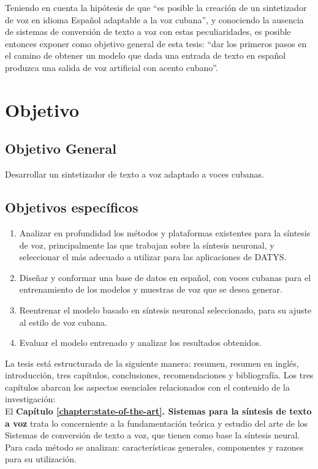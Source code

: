 Teniendo en cuenta la hipótesis de que “es posible la creación de un sintetizador de voz en idioma Español adaptable a la voz cubana”, y conociendo la ausencia de sistemas de conversión de texto a voz con estas peculiaridades, es posible entonces exponer como objetivo general de esta tesis: ``dar los primeros pasos en el camino de obtener un modelo que dada una entrada de texto en español produzca una salida de voz artificial con acento cubano''.

\section*{Objetivo}

\subsection*{Objetivo General}

Desarrollar un sintetizador de texto a voz adaptado a voces cubanas.

\subsection*{Objetivos específicos}
\begin{enumerate}
	\item Analizar en profundidad los métodos y plataformas existentes para la síntesis de voz, principalmente las que trabajan sobre la síntesis neuronal, y seleccionar el más adecuado a utilizar para las aplicaciones de DATYS.
	\item Diseñar y conformar una base de datos en español, con voces cubanas para el entrenamiento de los modelos y muestras de voz que se desea generar.
	\item Reentrenar el modelo basado en síntesis neuronal seleccionado, para su ajuste al estilo de voz cubana.
	\item Evaluar el modelo entrenado y analizar los resultados obtenidos.
\end{enumerate}

La tesis está estructurada de la siguiente manera: resumen, resumen en inglés, introducción, tres capítulos, conclusiones, recomendaciones y bibliografía. Los tres capítulos abarcan los aspectos esenciales relacionados con el contenido de la investigación:\\

El \textbf{Capítulo \ref{chapter:state-of-the-art}. Sistemas para la síntesis de texto a voz} trata lo concerniente a la fundamentación teórica y estudio del arte de los Sistemas de conversión de texto a voz, que tienen como base la síntesis neural. Para cada método se analizan: características generales, componentes y razones para su
utilización. \\

